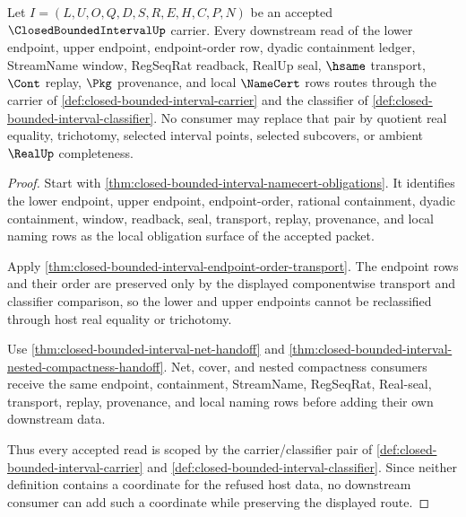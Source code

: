 \begin{theorem}
\label{thm:closed-bounded-interval-carrier-classifier-scope}
Let $I=(L,U,O,Q,D,S,R,E,H,C,P,N)$ be an accepted $\ClosedBoundedIntervalUp$ carrier. Every downstream read of the lower endpoint, upper endpoint, endpoint-order row, dyadic containment ledger, StreamName window, RegSeqRat readback, RealUp seal, $\hsame$ transport, $\Cont$ replay, $\Pkg$ provenance, and local $\NameCert$ rows routes through the carrier of \autoref{def:closed-bounded-interval-carrier} and the classifier of \autoref{def:closed-bounded-interval-classifier}. No consumer may replace that pair by quotient real equality, trichotomy, selected interval points, selected subcovers, or ambient $\RealUp$ completeness.
\end{theorem}
\begin{proof}
Start with \autoref{thm:closed-bounded-interval-namecert-obligations}. It identifies the lower endpoint, upper endpoint, endpoint-order, rational containment, dyadic containment, window, readback, seal, transport, replay, provenance, and local naming rows as the local obligation surface of the accepted packet.

Apply \autoref{thm:closed-bounded-interval-endpoint-order-transport}. The endpoint rows and their order are preserved only by the displayed componentwise transport and classifier comparison, so the lower and upper endpoints cannot be reclassified through host real equality or trichotomy.

Use \autoref{thm:closed-bounded-interval-net-handoff} and \autoref{thm:closed-bounded-interval-nested-compactness-handoff}. Net, cover, and nested compactness consumers receive the same endpoint, containment, StreamName, RegSeqRat, Real-seal, transport, replay, provenance, and local naming rows before adding their own downstream data.

Thus every accepted read is scoped by the carrier/classifier pair of \autoref{def:closed-bounded-interval-carrier} and \autoref{def:closed-bounded-interval-classifier}. Since neither definition contains a coordinate for the refused host data, no downstream consumer can add such a coordinate while preserving the displayed route.
\end{proof}

